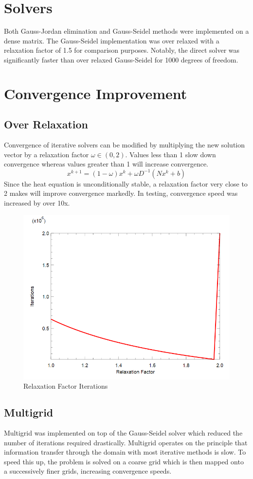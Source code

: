 \documentclass[12pt,twocolumn]{article}
\begin{document}
\section*{Solvers}
Both Gauss-Jordan elimination and Gauss-Seidel methods were implemented on a dense matrix. The Gauss-Seidel 
implementation was over relaxed with a relaxation factor of 1.5 for comparison purposes. Notably, the direct solver was significantly faster than
over relaxed Gauss-Seidel for 1000 degrees of freedom. 
\section*{Convergence Improvement}
\subsection*{Over Relaxation}
Convergence of iterative solvers can be modified by multiplying the new solution vector by a relaxation factor $\omega \in (0,2)$.
Values less than 1 slow down convergence whereas values greater than 1 will increase convergence.
\[x^{k+1}=(1-\omega) x^k+ \omega D^{-1}(N x^k+ b)\]
Since the heat equation is unconditionally stable, a relaxation factor very close to 2 makes will improve convergence markedly. In testing, convergence speed was increased by over 10x.
\begin{figure}
\includegraphics[width=\columnwidth]{sor.png}
\footnotesize{\caption{Relaxation Factor Iterations}}
\end{figure}
\subsection*{Multigrid}
Multigrid was implemented on top of the Gauss-Seidel solver
which reduced the number of iterations required drastically. Multigrid operates on the principle that information transfer through the domain
with most iterative methods is slow. To speed this up, the problem is solved on a coarse grid which is then mapped onto a successively finer grids,
increasing convergence speeds.
\end{document}
